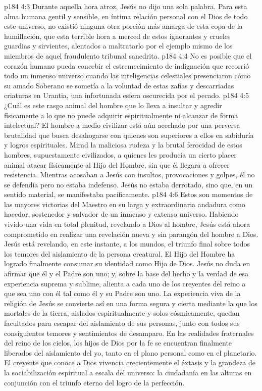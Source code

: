\vs p184 4:3 Durante aquella hora atroz, Jesús no dijo una sola palabra. Para esta alma humana gentil y sensible, en íntima relación personal con el Dios de todo este universo, no existió ninguna otra porción más amarga de esta copa de la humillación, que esta terrible hora a merced de estos ignorantes y crueles guardias y sirvientes, alentados a maltratarlo por el ejemplo mismo de los miembros de aquel fraudulento tribunal sanedrita.
\vs p184 4:4 \pc No es posible que el corazón humano pueda concebir el estremecimiento de indignación que recorrió todo un inmenso universo cuando las inteligencias celestiales presenciaron cómo su amado Soberano se sometía a la voluntad de estas zafias y descarriadas criaturas en Urantia, una infortunada esfera oscurecida por el pecado.
\vs p184 4:5 ¿Cuál es este rasgo animal del hombre que lo lleva a insultar y agredir físicamente a lo que no puede adquirir espiritualmente ni alcanzar de forma intelectual? El hombre a medio civilizar está aún acechado por una perversa brutalidad que busca desahogarse con quienes son superiores a ellos en sabiduría y logros espirituales. Mirad la maliciosa rudeza y la brutal ferocidad de estos hombres, supuestamente civilizados, a quienes les producía un cierto placer animal atacar físicamente al Hijo del Hombre, sin que él llegara a ofrecer resistencia. Mientras acosaban a Jesús con insultos, provocaciones y golpes, él no se defendía pero no estaba indefenso. Jesús no estaba derrotado, sino que, en un sentido material, se manifestaba pacíficamente.
\vs p184 4:6 Estos son momentos de las mayores victorias del Maestro en su larga y extraordinaria andadura como hacedor, sostenedor y salvador de un inmenso y extenso universo. Habiendo vivido una vida en total plenitud, revelando a Dios al hombre, Jesús está ahora comprometido en realizar una revelación nueva y sin parangón del hombre a Dios. Jesús está revelando, en este instante, a los mundos, el triunfo final sobre todos los temores del aislamiento de la persona creatural. El Hijo del Hombre ha logrado finalmente consumar su identidad como Hijo de Dios. Jesús no duda en afirmar que él y el Padre son uno; y, sobre la base del hecho y la verdad de esa experiencia suprema y sublime, alienta a cada uno de los creyentes del reino a que sea uno con él tal como él y su Padre son uno. La experiencia viva de la religión de Jesús se convierte así en una forma segura y cierta mediante la que los mortales de la tierra, aislados espiritualmente y solos cósmicamente, quedan facultados para escapar del aislamiento de sus personas, junto con todos sus consiguientes temores y sentimientos de desamparo. En las realidades fraternales del reino de los cielos, los hijos de Dios por la fe se encuentran finalmente liberados del aislamiento del yo, tanto en el plano personal como en el planetario. El creyente que conoce a Dios vivencia crecientemente el éxtasis y la grandeza de la sociabilización espiritual a escala del universo: la ciudadanía en las alturas en conjunción con el triunfo eterno del logro de la perfección.
